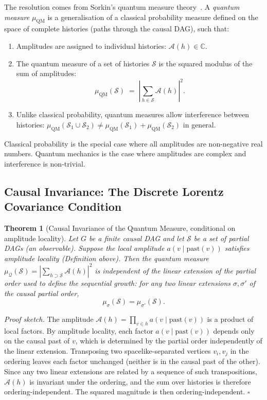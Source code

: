 \documentclass[11pt,a4paper]{article}
\theoremstyle{plain}
\newtheorem{theorem}{Theorem}[section]
\theoremstyle{definition}
\theoremstyle{remark}
\newcommand{\muC}{\mu_{\mathrm{QM}}}   %
\begin{document}
The resolution comes from Sorkin's quantum measure theory~\citep{Sorkin1994,
Sorkin2007}. A \emph{quantum measure} $\muC$ is a generalisation of a classical
probability measure defined on the space of complete histories (paths through
the causal DAG), such that:
\begin{enumerate}[noitemsep]
  \item Amplitudes are assigned to individual histories: $\mathcal{A}(h) \in \mathbb{C}$.
  \item The quantum measure of a set of histories $\mathcal{S}$ is the squared
  modulus of the sum of amplitudes:
  \begin{equation}
    \muC(\mathcal{S}) \;=\; \left|\sum_{h \in \mathcal{S}} \mathcal{A}(h)\right|^2.
    \label{eq:quantum_measure}
  \end{equation}
  \item Unlike classical probability, quantum measures allow interference
  between histories: $\muC(\mathcal{S}_1 \cup \mathcal{S}_2) \neq
  \muC(\mathcal{S}_1) + \muC(\mathcal{S}_2)$ in general.
\end{enumerate}
Classical probability is the special case where all amplitudes are
non-negative real numbers. Quantum mechanics is the case where amplitudes
are complex and interference is non-trivial.

\subsection{Causal Invariance: The Discrete Lorentz Covariance Condition}

\begin{theorem}[Causal Invariance of the Quantum Measure, conditional on amplitude locality]
\label{thm:causal_invariance}
Let $G$ be a finite causal DAG and let $\mathcal{S}$ be a set of partial
DAGs (an observable). Suppose the local amplitude $a(v \mid \mathrm{past}(v))$
satisfies amplitude locality (Definition above). Then the quantum measure
$\mu_{\mathcal{Q}}(\mathcal{S}) = |\sum_{h \supset \mathcal{S}} \mathcal{A}(h)|^2$
is independent of the linear extension of the partial order used to define
the sequential growth: for any two linear extensions $\sigma, \sigma'$ of
the causal partial order,
\[
  \mu_\sigma(\mathcal{S}) = \mu_{\sigma'}(\mathcal{S}).
\]
\end{theorem}

\noindent\textit{Proof sketch.} The amplitude $\mathcal{A}(h) =
\prod_{v \in h} a(v \mid \mathrm{past}(v))$ is a product of local factors.
By amplitude locality, each factor $a(v \mid \mathrm{past}(v))$ depends only
on the causal past of $v$, which is determined by the partial order
independently of the linear extension. Transposing two spacelike-separated
vertices $v_i, v_j$ in the ordering leaves each factor unchanged (neither is
in the causal past of the other). Since any two linear extensions are related
by a sequence of such transpositions, $\mathcal{A}(h)$ is invariant under
the ordering, and the sum over histories is therefore ordering-independent.
The squared magnitude is then ordering-independent.
\hfill$\square$
\end{document}
